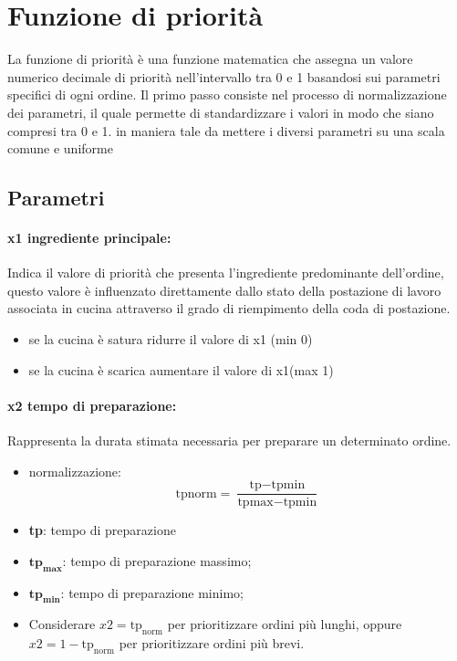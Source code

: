 \section{Funzione di priorità}
La funzione di priorità è una funzione matematica che assegna un valore numerico decimale di priorità nell’intervallo tra 0 e 1 basandosi sui parametri specifici di ogni ordine.
Il primo passo consiste nel processo di normalizzazione dei parametri, il quale permette di standardizzare i valori in modo che siano compresi tra 0 e 1. in maniera tale da mettere i diversi parametri su una scala comune e uniforme

\subsection{Parametri}

\paragraph{x1 ingrediente principale:}
Indica il valore di priorità che presenta l'ingrediente predominante dell’ordine, questo valore è influenzato direttamente dallo stato della postazione di lavoro associata in cucina attraverso il grado di riempimento della coda di postazione.
\begin{itemize}
	\item se la cucina è satura ridurre il valore di x1 (min 0)
	\item se la cucina è scarica aumentare il valore di x1(max 1)
\end{itemize}


\paragraph{x2 tempo di preparazione:}
Rappresenta la durata stimata necessaria per preparare un determinato ordine.
\begin{itemize}
	\item normalizzazione: 
	\begin{equation*}
		\text{tp}{\text{norm}} = \frac{\text{tp} - \text{tp}{\text{min}}}{\text{tp}{\text{max}} - \text{tp}{\text{min}}}	
	\end{equation*}
	
	\item \textbf{tp}: tempo di preparazione
	\item $\textbf{tp}_{\textbf{max}}$: tempo di preparazione massimo;
	\item $\textbf{tp}_{\textbf{min}}$: tempo di preparazione minimo;
	\item Considerare $x2 = \text{tp}_{\text{norm}}$ per prioritizzare ordini più lunghi, oppure $x2 = 1-\text{tp}_{\text{norm}}$ per prioritizzare ordini più brevi.
\end{itemize}



